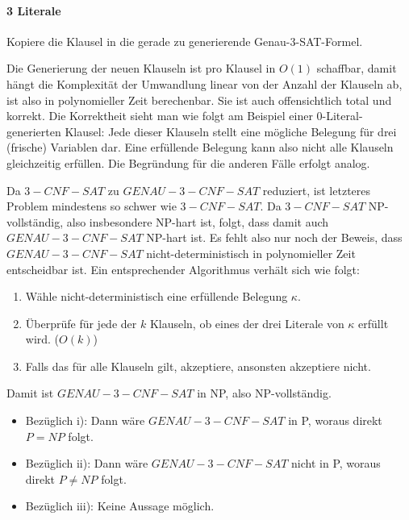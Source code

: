\paragraph{3 Literale}
Kopiere die Klausel in die gerade zu generierende Genau-3-SAT-Formel.
\par

Die Generierung der neuen Klauseln ist pro Klausel in $O(1)$ schaffbar, damit
hängt die Komplexität der Umwandlung linear von der Anzahl der Klauseln ab, ist
also in polynomieller Zeit berechenbar. Sie ist auch offensichtlich total und
korrekt. Die Korrektheit sieht man wie folgt am Beispiel einer
0-Literal-generierten Klausel: Jede dieser Klauseln stellt eine mögliche
Belegung für drei (frische) Variablen dar. Eine erfüllende Belegung kann also
nicht alle Klauseln gleichzeitig erfüllen. Die Begründung für die anderen Fälle
erfolgt analog.

Da $3-CNF-SAT$ zu $GENAU-3-CNF-SAT$ reduziert, ist letzteres Problem mindestens
so schwer wie $3-CNF-SAT$. Da $3-CNF-SAT$ NP-vollständig, also insbesondere
NP-hart ist, folgt, dass damit auch $GENAU-3-CNF-SAT$ NP-hart ist.
Es fehlt also nur noch der Beweis, dass $GENAU-3-CNF-SAT$
nicht-deterministisch in polynomieller Zeit entscheidbar ist. Ein entsprechender
Algorithmus verhält sich wie folgt:
\begin{enumerate}
	\item
		Wähle nicht-deterministisch eine erfüllende Belegung $\kappa$.
	\item
		Überprüfe für jede der $k$ Klauseln, ob eines der drei Literale
		von $\kappa$ erfüllt wird. ($O(k)$)
	\item
		Falls das für alle Klauseln gilt, akzeptiere, ansonsten
		akzeptiere nicht.
\end{enumerate}

Damit ist $GENAU-3-CNF-SAT$ in NP, also NP-vollständig.

\begin{itemize}
	\item
		Bezüglich i): Dann wäre $GENAU-3-CNF-SAT$ in P, woraus direkt $P = NP$ folgt.
	\item
		Bezüglich ii): Dann wäre $GENAU-3-CNF-SAT$ nicht in P, woraus
		direkt $P \neq NP$ folgt.
	\item
		Bezüglich iii): Keine Aussage möglich.
\end{itemize}
